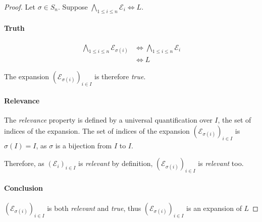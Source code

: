 \documentclass{article}
\theoremstyle{definition}
\begin{document}
\begin{proof}
	Let $\sigma\in S_n$.
	Suppose $\bigwedge_{1\le i\le n} \mathcal{E}_i \iff L$.
	\paragraph{Truth}

	\begin{align*}
		\bigwedge_{1\le i\le n} \mathcal{E}_{\sigma(i)} &\iff \bigwedge_{1\le i\le n} \mathcal{E}_i  \tag{by commutativity of $\land$} \\
								&\iff L \tag{by definition}
	\end{align*}

	The expansion $(\mathcal{E}_{\sigma(i)})_{i\in I}$ is therefore \emph{true}.

	\paragraph{Relevance}
	The \emph{relevance} property is defined by a universal quantification over $I$, the set of indices of the expansion.
	The set of indices of the expansion $(\mathcal{E}_{\sigma(i)})_{i\in I}$ is $\sigma(I) = I$, as $\sigma$ is a bijection from $I$ to $I$.

	Therefore, as  $(\mathcal{E}_i)_{i\in I}$ is \emph{relevant} by definition, $(\mathcal{E}_{\sigma(i)})_{i\in I}$ is \emph{relevant} too.

	\paragraph{Conclusion}
	$(\mathcal{E}_{\sigma(i)})_{i\in I}$ is both \emph{relevant}  and \emph{true}, thus $(\mathcal{E}_{\sigma(i)})_{i\in I}$ is an expansion of $L$
\end{proof}
\end{document}
